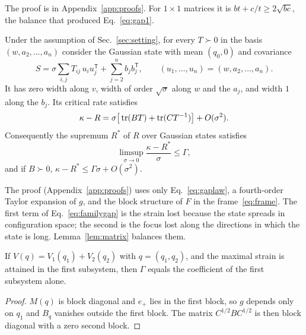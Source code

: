 The proof is in Appendix~\ref{app:proofs}. For $1\times1$ matrices it is $bt + c/t \geq 2\sqrt{bc}$, the balance that produced Eq.~\eqref{eq:gap1}.

\begin{theorem}
\label{thm:upper}
Under the assumption of Sec.~\ref{sec:setting}, for every $T \succ 0$ in the basis $(w, a_2,\dots,a_n)$ consider the Gaussian state with mean $(q_0, 0)$ and covariance
\begin{equation}
S = \sigma \sum_{i,j} T_{ij}\, u_i u_j^{\mathsf T} + \sum_{j=2}^n b_j b_j^{\mathsf T}, \qquad (u_1,\dots,u_n) = (w, a_2, \dots, a_n).
\label{eq:family}
\end{equation}
It has zero width along $v$, width of order $\sqrt\sigma$ along $w$ and the $a_j$, and width $1$ along the $b_j$. Its critical rate satisfies
\begin{equation}
\kappa - R = \sigma\big[\operatorname{tr}(BT) + \operatorname{tr}(CT^{-1})\big] + O(\sigma^2).
\label{eq:familygap}
\end{equation}
Consequently the supremum $R^*$ of $R$ over Gaussian states satisfies
\begin{equation}
\limsup_{\sigma\to0}\frac{\kappa - R^*}{\sigma} \leq \Gamma,
\label{eq:upper}
\end{equation}
and if $B \succ 0$, $\kappa - R^* \leq \Gamma\sigma + O(\sigma^2)$.
\end{theorem}

The proof (Appendix~\ref{app:proofs}) uses only Eq.~\eqref{eq:gaplaw}, a fourth-order Taylor expansion of $g$, and the block structure of $F$ in the frame~\eqref{eq:frame}. The first term of Eq.~\eqref{eq:familygap} is the strain lost because the state spreads in configuration space; the second is the focus lost along the directions in which the state is long. Lemma~\ref{lem:matrix} balances them.

\begin{corollary}
\label{cor:uncoupled}
If $V(q) = V_1(q_1) + V_2(q_2)$ with $q = (q_1,q_2)$, and the maximal strain is attained in the first subsystem, then $\Gamma$ equals the coefficient of the first subsystem alone.
\end{corollary}

\begin{proof}
$M(q)$ is block diagonal and $e_+$ lies in the first block, so $g$ depends only on $q_1$ and $B_q$ vanishes outside the first block. The matrix $C^{1/2}BC^{1/2}$ is then block diagonal with a zero second block.
\end{proof}

